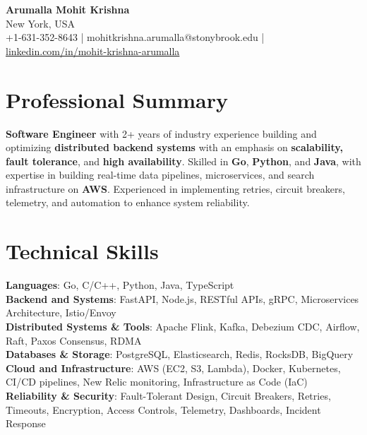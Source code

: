 \documentclass[letterpaper,11pt]{article}
\begin{document}
\begin{center}
  {\Large \textbf{Arumalla Mohit Krishna}} \\
  New York, USA \\
  +1-631-352-8643 \enspace | \enspace mohitkrishna.arumalla@stonybrook.edu \enspace | \enspace \href{https://www.linkedin.com/in/mohit-krishna-arumalla}{linkedin.com/in/mohit-krishna-arumalla}
\end{center}

\section{Professional Summary}
  \begin{itemize}[leftmargin=0.15in, label={}]
    \small{\item{
     \textbf{Software Engineer} with 2+ years of industry experience building and optimizing \textbf{distributed backend systems} with an emphasis on \textbf{scalability, fault tolerance}, and \textbf{high availability}. Skilled in \textbf{Go}, \textbf{Python}, and \textbf{Java}, with expertise in building real-time data pipelines, microservices, and search infrastructure on \textbf{AWS}. Experienced in implementing retries, circuit breakers, telemetry, and automation to enhance system reliability.
    }}
  \end{itemize}
\vspace{-16pt}

\section{Technical Skills}
 \begin{itemize}[leftmargin=0.15in, label={}]
    \small{\item{
     \textbf{Languages}: Go, C/C++, Python, Java, TypeScript \\
     \textbf{Backend and Systems}: FastAPI, Node.js, RESTful APIs, gRPC, Microservices Architecture, Istio/Envoy \\
     \textbf{Distributed Systems \& Tools}: Apache Flink, Kafka, Debezium CDC, Airflow, Raft, Paxos Consensus, RDMA \\
     \textbf{Databases \& Storage}: PostgreSQL, Elasticsearch, Redis, RocksDB, BigQuery \\
     \textbf{Cloud and Infrastructure}: AWS (EC2, S3, Lambda), Docker, Kubernetes, CI/CD pipelines, New Relic monitoring, Infrastructure as Code (IaC) \\
     \textbf{Reliability \& Security}: Fault-Tolerant Design, Circuit Breakers, Retries, Timeouts, Encryption, Access Controls, Telemetry, Dashboards, Incident Response
    }}
 \end{itemize}
\vspace{-16pt}
\end{document}
